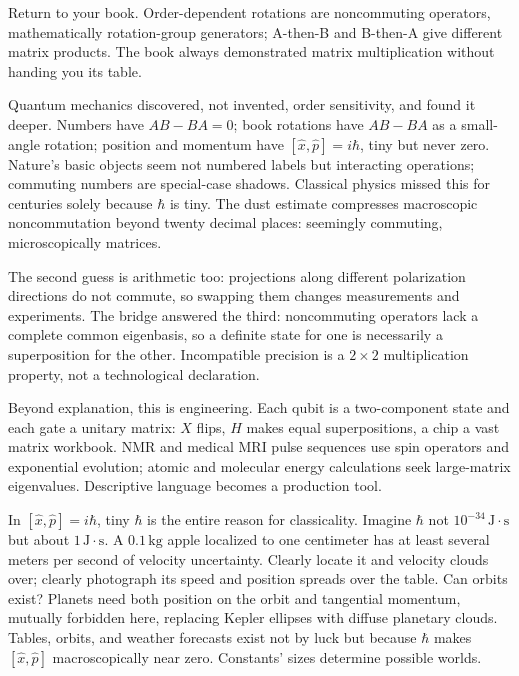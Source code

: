 
Return to your book. Order-dependent rotations are noncommuting operators, mathematically rotation-group generators; A-then-B and B-then-A give different matrix products. The book always demonstrated matrix multiplication without handing you its table.

Quantum mechanics discovered, not invented, order sensitivity, and found it deeper. Numbers have $AB-BA=0$; book rotations have $AB-BA$ as a small-angle rotation; position and momentum have $[\hat{x},\hat{p}]=i\hbar$, tiny but never zero. Nature's basic objects seem not numbered labels but interacting operations; commuting numbers are special-case shadows. Classical physics missed this for centuries solely because $\hbar$ is tiny. The dust estimate compresses macroscopic noncommutation beyond twenty decimal places: seemingly commuting, microscopically matrices.

The second guess is arithmetic too: projections along different polarization directions do not commute, so swapping them changes measurements and experiments. The bridge answered the third: noncommuting operators lack a complete common eigenbasis, so a definite state for one is necessarily a superposition for the other. Incompatible precision is a $2\times2$ multiplication property, not a technological declaration.

Beyond explanation, this is engineering. Each qubit is a two-component state and each gate a unitary matrix: $X$ flips, $H$ makes equal superpositions, a chip a vast matrix workbook. NMR and medical MRI pulse sequences use spin operators and exponential evolution; atomic and molecular energy calculations seek large-matrix eigenvalues. Descriptive language becomes a production tool.


\begin{thought}
In $[\hat{x},\hat{p}]=i\hbar$, tiny $\hbar$ is the entire reason for classicality. Imagine $\hbar$ not $10^{-34}\,\mathrm{J\cdot s}$ but about $1\,\mathrm{J\cdot s}$. A $0.1\,\mathrm{kg}$ apple localized to one centimeter has at least several meters per second of velocity uncertainty. Clearly locate it and velocity clouds over; clearly photograph its speed and position spreads over the table. Can orbits exist? Planets need both position on the orbit and tangential momentum, mutually forbidden here, replacing Kepler ellipses with diffuse planetary clouds. Tables, orbits, and weather forecasts exist not by luck but because $\hbar$ makes $[\hat{x},\hat{p}]$ macroscopically near zero. Constants' sizes determine possible worlds.
\end{thought}

